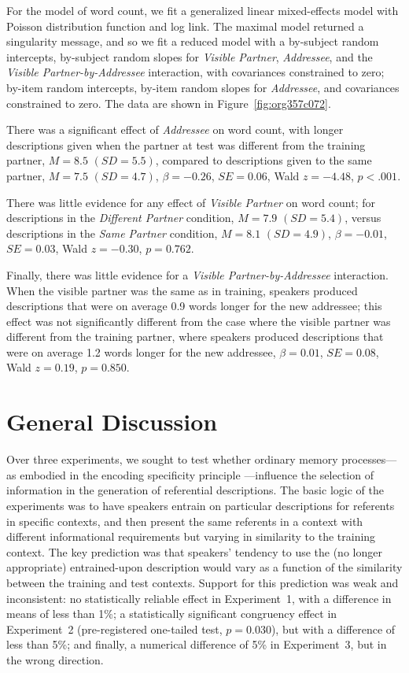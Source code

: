 \documentclass[natbib,man,a4paper]{apa6}
\begin{document}
For the model of word count, we fit a generalized linear mixed-effects model with Poisson distribution function and log link.  The maximal model returned a singularity message, and so we fit a reduced model with a by-subject random intercepts, by-subject random slopes for \emph{Visible Partner}, \emph{Addressee}, and the \emph{Visible Partner-by-Addressee} interaction, with covariances constrained to zero; by-item random intercepts, by-item random slopes for \emph{Addressee}, and covariances constrained to zero. The data are shown in Figure~\ref{fig:org357c072}.

There was a significant effect of \emph{Addressee} on word count, with longer descriptions given when the partner at test was different from the training partner,
\(M = 8.5\)  \((SD = 5.5)\),
compared to descriptions given to the same partner,
\(M = 7.5\)  \((SD = 4.7)\),
\(\beta = -0.26\), \(SE = 0.06\), Wald \(z = -4.48\), \(p < .001\).

There was little evidence for any effect of \emph{Visible Partner} on word count; 
for descriptions in the \emph{Different Partner} condition,
\(M = 7.9\)  \((SD = 5.4)\),
versus descriptions in the \emph{Same Partner} condition,
\(M = 8.1\)  \((SD = 4.9)\),
\(\beta = -0.01\), \(SE = 0.03\), Wald \(z = -0.30\), \(p = 0.762\).

Finally, there was little evidence for a \emph{Visible Partner-by-Addressee} interaction. When the visible partner was the same as in training, speakers produced descriptions that were on average 
0.9 
words longer for the new addressee; 
this effect was not significantly different from the case where the visible partner was different from the training partner, where speakers produced descriptions that were on average
1.2
words longer for the new addressee,
\(\beta = 0.01\), \(SE = 0.08\), Wald \(z = 0.19\), \(p = 0.850\).

\section*{General Discussion}
\label{sec:org52be15e}
Over three experiments, we sought to test whether ordinary memory processes---as embodied in the encoding specificity principle \citep{tulvingthomson73}---influence the selection of information in the generation of referential descriptions. The basic logic of the experiments was to have speakers entrain on particular descriptions for referents in specific contexts, and then present the same referents in a context with different informational requirements but varying in similarity to the training context. The key prediction was that speakers' tendency to use the (no longer appropriate) entrained-upon description would vary as a function of the similarity between the training and test contexts. Support for this prediction was weak and inconsistent: no statistically reliable effect in Experiment~1, with a difference in means of less than 1\%; a statistically significant congruency effect in Experiment~2 (pre-registered one-tailed test, \(p =\)0.030), but with a difference of less than 5\%; and finally, a numerical difference of 5\% in Experiment~3, but in the wrong direction.
\end{document}
